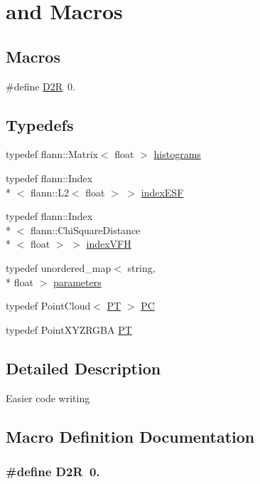 \hypertarget{group__Typedefs}{\section{and Macros}
\label{group__Typedefs}
}
\subsection*{Macros}
\begin{DoxyCompactItemize}
\item 
\#define \hyperlink{group__Typedefs_ga0a3cc1d5cde549e408f825ddd7f5853d}{D2\-R}~0.
\end{DoxyCompactItemize}
\subsection*{Typedefs}
\begin{DoxyCompactItemize}
\item 
typedef flann\-::\-Matrix$<$ float $>$ \hyperlink{group__Typedefs_ga136493056b2eaf642f660e6a45a62991}{histograms}
\item 
typedef flann\-::\-Index\\*
$<$ flann\-::\-L2$<$ float $>$ $>$ \hyperlink{group__Typedefs_ga3f45d3216269cf676ea864ae3bfcc446}{index\-E\-S\-F}
\item 
typedef flann\-::\-Index\\*
$<$ flann\-::\-Chi\-Square\-Distance\\*
$<$ float $>$ $>$ \hyperlink{group__Typedefs_gacea1a4bf0f6b886a58ff00ff9cb54b34}{index\-V\-F\-H}
\item 
typedef unordered\-\_\-map$<$ string, \\*
float $>$ \hyperlink{group__Typedefs_gacbb28d8f791bb363852e522cf3b83c47}{parameters}
\item 
typedef Point\-Cloud$<$ \hyperlink{group__Typedefs_ga102df08e7bbccbe3fa6e0b53fd9bac74}{P\-T} $>$ \hyperlink{group__Typedefs_ga62eb21fcfa3189c5de50fb62a2a7a79e}{P\-C}
\item 
typedef Point\-X\-Y\-Z\-R\-G\-B\-A \hyperlink{group__Typedefs_ga102df08e7bbccbe3fa6e0b53fd9bac74}{P\-T}
\end{DoxyCompactItemize}


\subsection{Detailed Description}
Easier code writing 

\subsection{Macro Definition Documentation}
\hypertarget{group__Typedefs_ga0a3cc1d5cde549e408f825ddd7f5853d}{
\subsubsection[{D2\-R}]{\setlength{\rightskip}{0pt plus 5cm}\#define D2\-R~0.}}\label{group__Typedefs_ga0a3cc1d5cde549e408f825ddd7f5853d}


